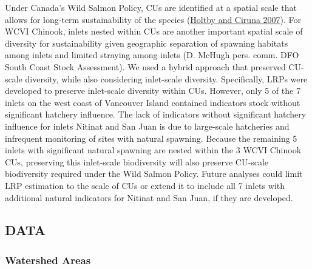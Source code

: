 \documentclass[11pt]{book}
\begin{document}
Under Canada's Wild Salmon Policy, CUs are identified at a spatial scale that allows for long-term sustainability of the species (\protect\hyperlink{ref-holtbyConservationUnitsPacific2007}{Holtby and Ciruna 2007}). For WCVI Chinook, inlets nested within CUs are another important spatial scale of diversity for sustainability given geographic separation of spawning habitats among inlets and limited straying among inlets (D. McHugh pers. comm. DFO South Coast Stock Assessment). We used a hybrid approach that preserved CU-scale diversity, while also considering inlet-scale diversity. Specifically, LRPs were developed to preserve inlet-scale diversity within CUs. However, only 5 of the 7 inlets on the west coast of Vancouver Island contained indicators stock without significant hatchery influence. The lack of indicators without significant hatchery influence for inlets Nitinat and San Juan is due to large-scale hatcheries and infrequent monitoring of sites with natural spawning. Because the remaining 5 inlets with significant natural spawning are nested within the 3 WCVI Chinook CUs, preserving this inlet-scale biodiversity will also preserve CU-scale biodiversity required under the Wild Salmon Policy. Future analyses could limit LRP estimation to the scale of CUs or extend it to include all 7 inlets with additional natural indicators for Nitinat and San Juan, if they are developed.

\hypertarget{data}{%
\subsection{DATA}\label{data}}

\hypertarget{watershed-areas}{%
\subsubsection{Watershed Areas}\label{watershed-areas}}
\end{document}

